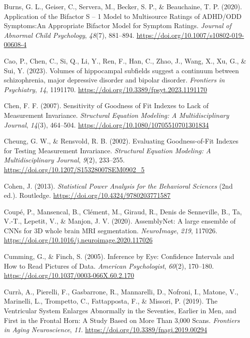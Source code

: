 \documentclass[
]{article}
\newlength{\cslhangindent}
\newenvironment{CSLReferences}[2] %
 {\begin{list}{}{%
  \setlength{\itemindent}{0pt}
  \setlength{\leftmargin}{0pt}
  \setlength{\parsep}{0pt}
  \ifodd #1
   \setlength{\leftmargin}{\cslhangindent}
   \setlength{\itemindent}{-1\cslhangindent}
  \fi
  \setlength{\itemsep}{#2\baselineskip}}}
 {\end{list}}
\begin{document}
\begin{CSLReferences}{1}{0}
Burns, G. L., Geiser, C., Servera, M., Becker, S. P., \& Beauchaine, T.
P. (2020). Application of the {Bifactor} {S} -- 1 {Model} to
{Multisource} {Ratings} of {ADHD}/{ODD} {Symptoms}:{An} {Appropriate}
{Bifactor} {Model} for {Symptom} {Ratings}. \emph{Journal of Abnormal
Child Psychology}, \emph{48}(7), 881--894.
\url{https://doi.org/10.1007/s10802-019-00608-4}

Cao, P., Chen, C., Si, Q., Li, Y., Ren, F., Han, C., Zhao, J., Wang, X.,
Xu, G., \& Sui, Y. (2023). Volumes of hippocampal subfields suggest a
continuum between schizophrenia, major depressive disorder and bipolar
disorder. \emph{Frontiers in Psychiatry}, \emph{14}, 1191170.
\url{https://doi.org/10.3389/fpsyt.2023.1191170}

Chen, F. F. (2007). Sensitivity of {Goodness} of {Fit} {Indexes} to
{Lack} of {Measurement} {Invariance}. \emph{Structural Equation
Modeling: A Multidisciplinary Journal}, \emph{14}(3), 464--504.
\url{https://doi.org/10.1080/10705510701301834}

Cheung, G. W., \& Rensvold, R. B. (2002). Evaluating {Goodness}-of-{Fit}
{Indexes} for {Testing} {Measurement} {Invariance}. \emph{Structural
Equation Modeling: A Multidisciplinary Journal}, \emph{9}(2), 233--255.
\url{https://doi.org/10.1207/S15328007SEM0902_5}

Cohen, J. (2013). \emph{Statistical {Power} {Analysis} for the
{Behavioral} {Sciences}} (2nd ed.). Routledge.
\url{https://doi.org/10.4324/9780203771587}

Coupé, P., Mansencal, B., Clément, M., Giraud, R., Denis de Senneville,
B., Ta, V.-T., Lepetit, V., \& Manjon, J. V. (2020). {AssemblyNet}: {A}
large ensemble of {CNNs} for {3D} whole brain {MRI} segmentation.
\emph{NeuroImage}, \emph{219}, 117026.
\url{https://doi.org/10.1016/j.neuroimage.2020.117026}

Cumming, G., \& Finch, S. (2005). Inference by {Eye}: {Confidence}
{Intervals} and {How} to {Read} {Pictures} of {Data}. \emph{American
Psychologist}, \emph{60}(2), 170--180.
\url{https://doi.org/10.1037/0003-066X.60.2.170}

Currà, A., Pierelli, F., Gasbarrone, R., Mannarelli, D., Nofroni, I.,
Matone, V., Marinelli, L., Trompetto, C., Fattapposta, F., \& Missori,
P. (2019). The {Ventricular} {System} {Enlarges} {Abnormally} in the
{Seventies}, {Earlier} in {Men}, and {First} in the {Frontal} {Horn}:
{A} {Study} {Based} on {More} {Than} 3,000 {Scans}. \emph{Frontiers in
Aging Neuroscience}, \emph{11}.
\url{https://doi.org/10.3389/fnagi.2019.00294}


\end{CSLReferences}
\end{document}
